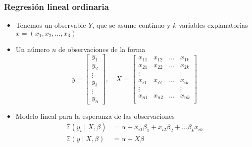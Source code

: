 \documentclass[xcolor=dvipsnames,10pt]{beamer}
\begin{document}
\begin{frame}
  \frametitle{Regresión lineal ordinaria}
  \begin{itemize}
  \item Tenemos un observable $Y$, que se asume contínuo y $k$ variables explanatorias $x = (x_1, x_2, \dots, x_3)$
  \item Un número $n$ de observaciones de la forma
    \begin{equation*}
      y =
      \begin{bmatrix}
        y_1\\y_2\\\vdots\\y_i\\\vdots\\y_n
      \end{bmatrix}, \quad%
      X = \begin{bmatrix}
        x_{11} & x_{12} & \hdots & x_{1k}\\
        x_{21} & x_{22} & \hdots & x_{2k}\\
        \vdots & & & \vdots\\
        x_{i1} & x_{i2} & \hdots & x_{ik}\\
        \vdots & & & \vdots\\
        x_{n1} & x_{n2} & \hdots & x_{nk}\\
      \end{bmatrix}
    \end{equation*}
  \item Modelo lineal para la esperanza de las observaciones
    \begin{align*}
      \mathbb{E}(y_i \mid X, \beta) &= \alpha + x_{i1} \beta_1 + x_{i2} \beta_2 + \dots \beta_k x_{ik}\\
      \mathbb{E}(y \mid X, \beta) &= \alpha + X \beta
    \end{align*}
  \end{itemize}
\end{frame}
%
\end{document}
